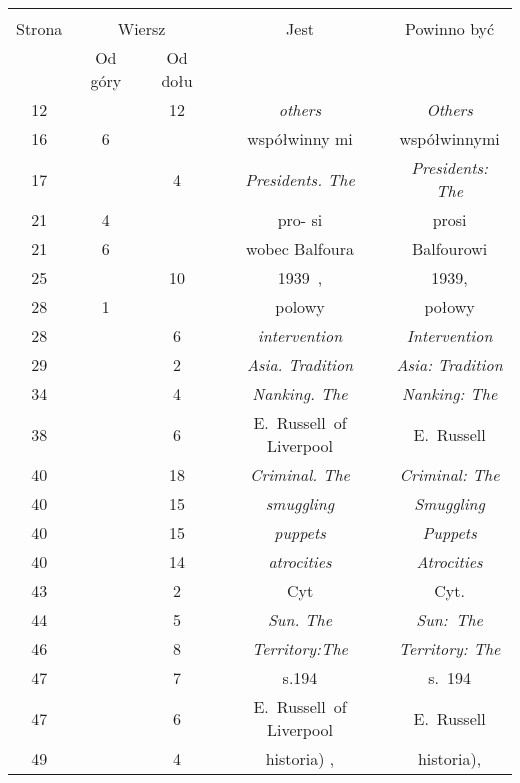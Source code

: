 \documentclass[a4paper,11pt]{article}
\begin{document}
\begin{center}
  \begin{tabular}{|c|c|c|c|c|}
    \hline
    & \multicolumn{2}{c|}{} & & \\
    Strona & \multicolumn{2}{c|}{Wiersz} & Jest
                              & Powinno być \\ \cline{2-3}
    & Od góry & Od dołu & & \\
    \hline
    12  & & 12 & \emph{others} & \emph{Others} \\
    16  &  6 & & współwinny mi & współwinnymi \\
    17  & &  4 & \emph{Presidents. The} & \emph{Presidents: The} \\
    21  &  4 & & pro- si & prosi \\
    21  &  6 & & wobec Balfoura & Balfourowi \\
    25  & & 10 & 1939~, & 1939, \\
    28  &  1 & & polowy & połowy \\
    28  & &  6 & \emph{intervention} & \emph{Intervention} \\
    29  & &  2 & \emph{Asia. Tradition} & \emph{Asia: Tradition} \\
    34  & &  4 & \emph{Nanking. The} & \emph{Nanking: The} \\
    38  & &  6 & E.~Russell~of Liverpool & E.~Russell \\
    40  & & 18 & \emph{Criminal. The} & \emph{Criminal: The} \\
    40  & & 15 & \emph{smuggling} & \emph{Smuggling} \\
    40  & & 15 & \emph{puppets} & \emph{Puppets} \\
    40  & & 14 & \emph{atrocities} & \emph{Atrocities} \\
    43  & &  2 & Cyt & Cyt. \\
    44  & &  5 & \emph{Sun. The} & \emph{Sun:~The} \\
    46  & &  8 & \emph{Territory:The} & \emph{Territory: The} \\
    47  & &  7 & s.194 & s.~194 \\
    47  & &  6 & E.~Russell~of Liverpool & E.~Russell \\
    49  & &  4 & historia) , & historia), \\
    \hline
  \end{tabular}



\end{center}
\end{document}
